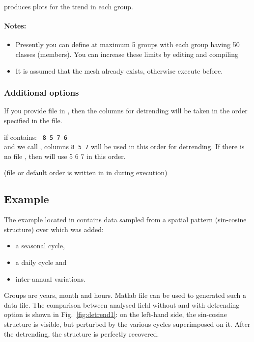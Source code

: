  produces plots for the trend in each group.


\paragraph{Notes:} 
\begin{itemize}
\item Presently you can define at maximum 5 groups with each group having 50 classes (members). You can increase these limits by editing and compiling 
\item It is assumed that the mesh already exists, otherwise execute  before.
\end{itemize}

\subsubsection{Additional options}

If you provide file  in , then the columns for detrending will be taken in the order 
specified in the file. 

\example if  contains:
\texttt{
8 5 7 6
}\\
and we call , columns \texttt{8 5 7} will be used in this order for detrending. If there is no file , then  will use 5 6 7 in this order.

(file  or default order is written in  in  during execution)




\subsection{Example}

The example located in  contains data sampled from a spatial pattern (sin-cosine structure) over which was added: 
\begin{itemize}
\item a seasonal cycle, 
\item a daily cycle and 
\item inter-annual variations.
\end{itemize}

Groups are years, month and hours. Matlab file  can be used to generated such a data file. The comparison between analysed field without and with detrending option is shown in Fig.~\ref{fig:detrend1}: on the left-hand side, the sin-cosine structure is visible, but perturbed by the various cycles superimposed on it. After the detrending, the structure is perfectly recovered.

